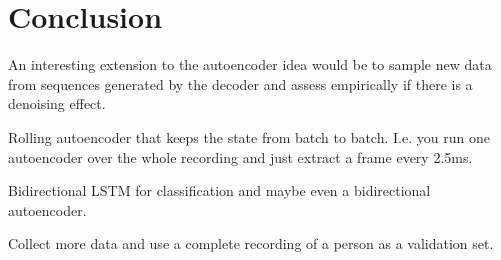 \chapter{Conclusion}
\label{cha:conclusion}

An interesting extension to the autoencoder idea would be to sample new data
from sequences generated by the decoder and assess empirically if there is a
denoising effect.

Rolling autoencoder that keeps the state from batch to batch. I.e. you run one
autoencoder over the whole recording and just extract a frame every 2.5ms.

Bidirectional LSTM for classification and maybe even a bidirectional
autoencoder.

Collect more data and use a complete recording of a person as a validation set.
